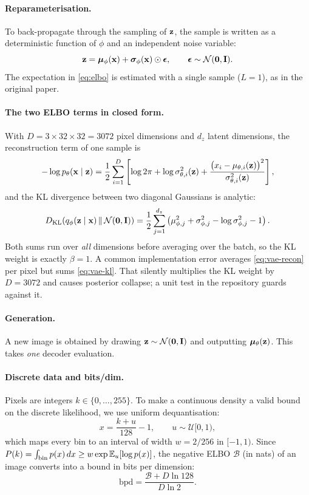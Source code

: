 \paragraph{Reparameterisation.} To back-propagate through the sampling of $\mathbf{z}$, the sample is written as a
deterministic function of $\phi$ and an independent noise variable:
\begin{equation}
  \mathbf{z} = \bm{\mu}_\phi(\mathbf{x}) + \bm{\sigma}_\phi(\mathbf{x})\odot\bm{\epsilon}, \qquad \bm{\epsilon} \sim \mathcal{N}(\mathbf{0},\mathbf{I}).
\end{equation}
The expectation in \cref{eq:elbo} is estimated with a single sample ($L=1$), as in the original paper.

\paragraph{The two ELBO terms in closed form.} With $D = 3\times32\times32 = 3072$ pixel dimensions and $d_z$
latent dimensions, the reconstruction term of one sample is
\begin{equation}
  -\log p_\theta(\mathbf{x}\mid\mathbf{z}) = \frac{1}{2}\sum_{i=1}^{D}\left[\log 2\pi + \log\sigma^2_{\theta,i}(\mathbf{z})
  + \frac{\big(x_i-\mu_{\theta,i}(\mathbf{z})\big)^2}{\sigma^2_{\theta,i}(\mathbf{z})}\right],
  \label{eq:vae-recon}
\end{equation}
and the KL divergence between two diagonal Gaussians is analytic:
\begin{equation}
  D_{\mathrm{KL}}\!\left(q_\phi(\mathbf{z}\mid\mathbf{x})\,\middle\|\,\mathcal{N}(\mathbf{0},\mathbf{I})\right) = \frac{1}{2}\sum_{j=1}^{d_z}\left(\mu_{\phi,j}^2 + \sigma_{\phi,j}^2
  - \log\sigma_{\phi,j}^2 - 1\right).
  \label{eq:vae-kl}
\end{equation}
Both sums run over \emph{all} dimensions before averaging over the batch, so the KL weight is exactly $\beta=1$. A
common implementation error averages \cref{eq:vae-recon} per pixel but sums \cref{eq:vae-kl}. That silently
multiplies the KL weight by $D=3072$ and causes posterior collapse; a unit test in the repository guards against it.

\paragraph{Generation.} A new image is obtained by drawing $\mathbf{z}\sim\mathcal{N}(\mathbf{0},\mathbf{I})$ and outputting
$\bm{\mu}_\theta(\mathbf{z})$. This takes \emph{one} decoder evaluation.

\paragraph{Discrete data and bits/dim.} Pixels are integers $k\in\{0,\dots,255\}$. To make a continuous density a
valid bound on the discrete likelihood, we use uniform dequantisation:
\begin{equation}
  x = \frac{k+u}{128} - 1, \qquad u\sim\mathcal{U}[0,1),
\end{equation}
which maps every bin to an interval of width $w=2/256$ in $[-1,1)$. Since
$P(k) = \int_{\text{bin}} p(x)\,dx \ge w \exp\mathbb{E}_u[\log p(x)]$, the negative ELBO $\mathcal{B}$ (in nats) of an
image converts into a bound in bits per dimension:
\begin{equation}
  \mathrm{bpd} = \frac{\mathcal{B} + D\ln 128}{D\ln 2}.
  \label{eq:bpd}
\end{equation}

